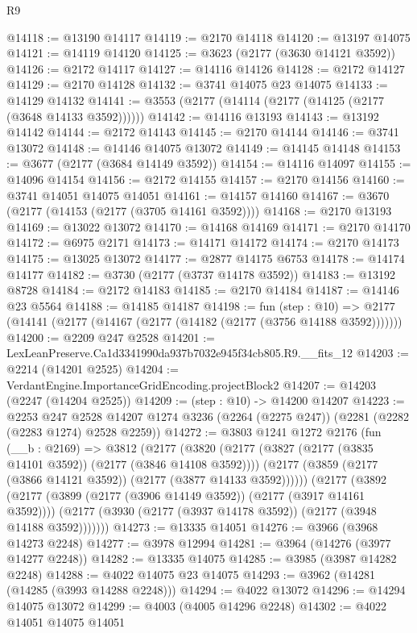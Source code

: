 \begin{lexlean}{R9}
\begin{coremodule}
@14118 := @13190 @14117
@14119 := @2170 @14118
@14120 := @13197 @14075
@14121 := @14119 @14120
@14125 := @3623 (@2177 (@3630 @14121 @3592))
@14126 := @2172 @14117
@14127 := @14116 @14126
@14128 := @2172 @14127
@14129 := @2170 @14128
@14132 := @3741 @14075 @23 @14075
@14133 := @14129 @14132
@14141 := @3553 (@2177 (@14114 (@2177 (@14125 (@2177 (@3648 @14133 @3592))))))
@14142 := @14116 @13193
@14143 := @13192 @14142
@14144 := @2172 @14143
@14145 := @2170 @14144
@14146 := @3741 @13072
@14148 := @14146 @14075 @13072
@14149 := @14145 @14148
@14153 := @3677 (@2177 (@3684 @14149 @3592))
@14154 := @14116 @14097
@14155 := @14096 @14154
@14156 := @2172 @14155
@14157 := @2170 @14156
@14160 := @3741 @14051 @14075 @14051
@14161 := @14157 @14160
@14167 := @3670 (@2177 (@14153 (@2177 (@3705 @14161 @3592))))
@14168 := @2170 @13193
@14169 := @13022 @13072
@14170 := @14168 @14169
@14171 := @2170 @14170
@14172 := @6975 @2171
@14173 := @14171 @14172
@14174 := @2170 @14173
@14175 := @13025 @13072
@14177 := @2877 @14175 @6753
@14178 := @14174 @14177
@14182 := @3730 (@2177 (@3737 @14178 @3592))
@14183 := @13192 @8728
@14184 := @2172 @14183
@14185 := @2170 @14184
@14187 := @14146 @23 @5564
@14188 := @14185 @14187
@14198 := fun (step : @10) =>
  @2177 (@14141 (@2177 (@14167 (@2177 (@14182 (@2177 (@3756 @14188 @3592)))))))
@14200 := @2209 @247 @2528
@14201 := LexLeanPreserve.Ca1d3341990da937b7032e945f34cb805.R9.__fits_12
@14203 := @2214 (@14201 @2525)
@14204 := VerdantEngine.ImportanceGridEncoding.projectBlock2
@14207 := @14203 (@2247 (@14204 @2525))
@14209 := (step : @10) -> @14200 @14207
@14223 := @2253
    @247
    @2528
    @14207
    @1274
    @3236
    (@2264 (@2275 @247))
    (@2281 (@2282 (@2283 @1274) @2528 @2259))
@14272 := @3803
    @1241
    @1272
    @2176
    (fun (__b : @2169) =>
    @3812
      (@2177
        (@3820
          (@2177 (@3827 (@2177 (@3835 @14101 @3592)) (@2177 (@3846 @14108 @3592))))
          (@2177 (@3859 (@2177 (@3866 @14121 @3592)) (@2177 (@3877 @14133 @3592))))))
      (@2177
        (@3892
          (@2177 (@3899 (@2177 (@3906 @14149 @3592)) (@2177 (@3917 @14161 @3592))))
          (@2177 (@3930 (@2177 (@3937 @14178 @3592)) (@2177 (@3948 @14188 @3592)))))))
@14273 := @13335 @14051
@14276 := @3966 (@3968 @14273 @2248)
@14277 := @3978 @12994
@14281 := @3964 (@14276 (@3977 @14277 @2248))
@14282 := @13335 @14075
@14285 := @3985 (@3987 @14282 @2248)
@14288 := @4022 @14075 @23 @14075
@14293 := @3962 (@14281 (@14285 (@3993 @14288 @2248)))
@14294 := @4022 @13072
@14296 := @14294 @14075 @13072
@14299 := @4003 (@4005 @14296 @2248)
@14302 := @4022 @14051 @14075 @14051

\end{coremodule}
\end{lexlean}
